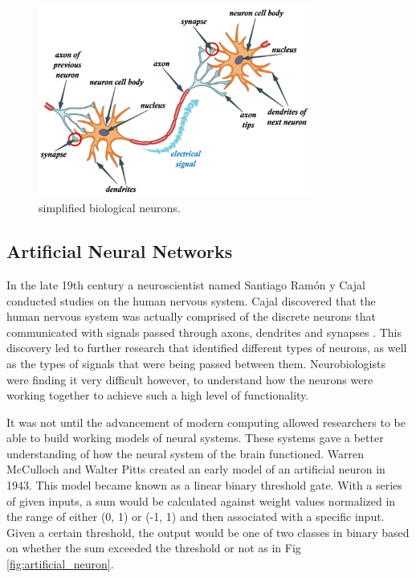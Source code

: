 \documentclass[12pt, a4paper, twoside]{report}
\begin{document}
\begin{figure}[ht]
	\centering
	\includegraphics[width=0.8\textwidth]
	{images/chapter4/biological_neuron}
	\caption{simplified biological neurons.}
	\label{fig:biological_neuron}
\end{figure}

\subsection{Artificial Neural Networks}
In the late 19th century a neuroscientist named Santiago Ramón y Cajal conducted studies on the human nervous system. Cajal discovered that the human nervous system was actually comprised of the discrete neurons that communicated with signals passed through axons, dendrites and synapses . This discovery led to further research that identified different types of neurons, as well as the types of signals that were being passed between them. Neurobiologists were finding it very difficult however, to understand how the neurons were working together to achieve such a high level of functionality.
\par
It was not until the advancement of modern computing allowed researchers to be able to build working models of neural systems. These systems gave a better understanding of how the neural system of the brain functioned. Warren McCulloch and Walter Pitts created an early model of an artificial neuron in 1943. This model became known as a linear binary threshold gate. With a series of given inputs, a sum would be calculated against weight values normalized in the range of either (0, 1) or (-1, 1) and then associated with a specific input. Given a certain threshold, the output would be one of two classes in binary based on whether the sum exceeded the threshold or not as in Fig \ref{fig:artificial_neuron}.
\end{document}
